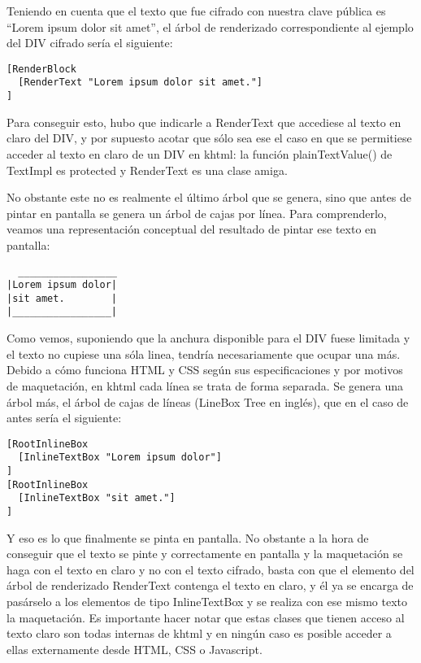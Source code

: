 Teniendo en cuenta que el texto que fue cifrado con nuestra clave pública es ``Lorem ipsum dolor sit amet'', el árbol de renderizado correspondiente al ejemplo del DIV cifrado sería el siguiente:

\begin{verbatim}
[RenderBlock
  [RenderText "Lorem ipsum dolor sit amet."]
] 
\end{verbatim}

Para conseguir esto, hubo que indicarle a RenderText que accediese al texto en claro del DIV, y por supuesto acotar que sólo sea ese el caso en que se permitiese acceder al texto en claro de un DIV en khtml: la función plainTextValue() de TextImpl es protected y RenderText es una clase amiga.

No obstante este no es realmente el último árbol que se genera, sino que antes de pintar en pantalla se genera un árbol de cajas por línea. Para comprenderlo, veamos una representación conceptual del resultado de pintar ese texto en pantalla:

\begin{verbatim}
  _________________
|Lorem ipsum dolor|
|sit amet.        |
|_________________|
\end{verbatim}

Como vemos, suponiendo que la anchura disponible para el DIV fuese limitada y el texto no cupiese una sóla linea, tendría necesariamente que ocupar una más. Debido a cómo funciona HTML y CSS según sus especificaciones y por motivos de maquetación, en khtml cada línea se trata de forma separada. Se genera una árbol más, el árbol de cajas de líneas (LineBox Tree en inglés), que en el caso de antes sería el siguiente:

\begin{verbatim}
[RootInlineBox
  [InlineTextBox "Lorem ipsum dolor"]
]
[RootInlineBox
  [InlineTextBox "sit amet."]
]
\end{verbatim}

Y eso es lo que finalmente se pinta en pantalla. No obstante a la hora de conseguir que el texto se pinte y correctamente en pantalla y la maquetación se haga con el texto en claro y no con el texto cifrado, basta con que el elemento del árbol de renderizado RenderText contenga el texto en claro, y él ya se encarga de pasárselo a los elementos de tipo InlineTextBox y se realiza con ese mismo texto la maquetación. Es importante hacer notar que estas clases que tienen acceso al texto claro son todas internas de khtml y en ningún caso es posible acceder a ellas externamente desde HTML, CSS o Javascript.

